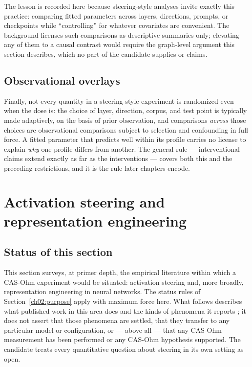 The lesson is recorded here because steering-style analyses invite exactly this practice: comparing fitted parameters across layers, directions, prompts, or checkpoints while ``controlling'' for whatever covariates are convenient. The background licenses such comparisons as descriptive summaries only; elevating any of them to a causal contrast would require the graph-level argument this section describes, which no part of the candidate supplies or claims.

\subsection{Observational overlays}\label{ch02:causal:overlays}

Finally, not every quantity in a steering-style experiment is randomized even when the dose is: the choice of layer, direction, corpus, and test point is typically made adaptively, on the basis of prior observation, and comparisons \emph{across} those choices are observational comparisons subject to selection and confounding in full force. A fitted parameter that predicts well within its profile carries no license to explain \emph{why} one profile differs from another. The general rule --- interventional claims extend exactly as far as the interventions --- covers both this and the preceding restrictions, and it is the rule later chapters encode.

\section{Activation steering and representation engineering}\label{ch02:steering}

\subsection{Status of this section}\label{ch02:steering:status}

This section surveys, at primer depth, the empirical literature within which a CAS-Ohm experiment would be situated: activation steering and, more broadly, representation engineering in neural networks. The status rules of Section~\ref{ch02:purpose} apply with maximum force here. What follows describes what published work in this area does and the kinds of phenomena it reports \cite{zourepe}; it does not assert that those phenomena are settled, that they transfer to any particular model or configuration, or --- above all --- that any CAS-Ohm measurement has been performed or any CAS-Ohm hypothesis supported. The candidate treats every quantitative question about steering in its own setting as open.

